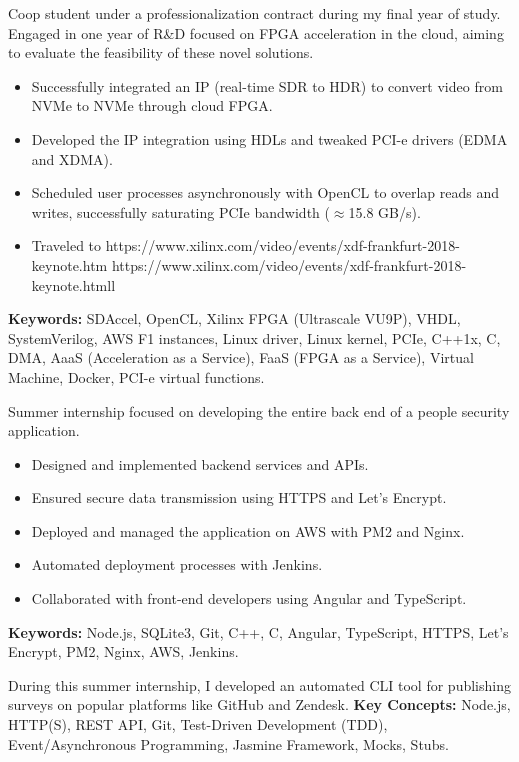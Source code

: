 \documentclass[11pt,a4paper]{moderncv}
\begin{document}
    {
        Coop student under a professionalization contract during my final year of study. Engaged in one year of R\&D focused on FPGA acceleration in the cloud, aiming to evaluate the feasibility of these novel solutions.
        \begin{itemize}
            \item Successfully integrated an IP (real-time SDR to HDR) to convert video from NVMe to NVMe through cloud FPGA.
            \item Developed the IP integration using HDLs and tweaked PCI-e drivers (EDMA and XDMA).
            \item Scheduled user processes asynchronously with OpenCL to overlap reads and writes, successfully saturating PCIe bandwidth ($\approx$15.8 GB/s).
            \item \color{blue} Traveled to https://www.xilinx.com/video/events/xdf-frankfurt-2018-keynote.htm https://www.xilinx.com/video/events/xdf-frankfurt-2018-keynote.htmll
        \end{itemize}
        \textbf{Keywords:} SDAccel, OpenCL, Xilinx FPGA (Ultrascale VU9P), VHDL, SystemVerilog, AWS F1 instances, Linux driver, Linux kernel, PCIe, C++1x, C, DMA, AaaS (Acceleration as a Service), FaaS (FPGA as a Service), Virtual Machine, Docker, PCI-e virtual functions.
    }


    {
        Summer internship focused on developing the entire back end of a people security application.
        \begin{itemize}
            \item Designed and implemented backend services and APIs.
            \item Ensured secure data transmission using HTTPS and Let's Encrypt.
            \item Deployed and managed the application on AWS with PM2 and Nginx.
            \item Automated deployment processes with Jenkins.
            \item Collaborated with front-end developers using Angular and TypeScript.
        \end{itemize}
        \textbf{Keywords:} Node.js, SQLite3, Git, C++, C, Angular, TypeScript, HTTPS, Let's Encrypt, PM2, Nginx, AWS, Jenkins.
    }


    {
        During this summer internship, I developed an automated CLI tool for publishing surveys on popular platforms like GitHub and Zendesk. 
        \textbf{Key Concepts:} Node.js, HTTP(S), REST API, Git, Test-Driven Development (TDD), Event/Asynchronous Programming, Jasmine Framework, Mocks, Stubs.
    }
\end{document}
